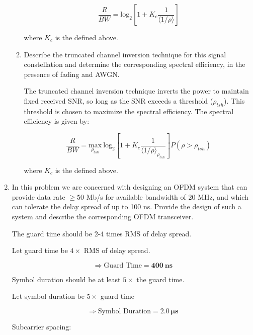 \documentclass[fleqn]{article}
\begin{document}
\begin{enumerate}
\begin{enumerate}
			\begin{equation*}
				\frac{R}{BW} = \text{log}_2\left[1 + K_c\frac{1}{\langle1/\rho\rangle}\right]
			\end{equation*}
			
			where $K_c$ is the defined above.
			
			\item Describe the truncated channel inversion technique for this signal constellation and determine the corresponding spectral efficiency, in the presence of fading and AWGN.
			
			The truncated channel inversion technique inverts the power to maintain fixed received SNR, so long as the SNR exceeds a threshold ($\rho_{tsh}$). This threshold is chosen to maximize the spectral efficiency. The spectral efficiency is given by:
			
			\begin{equation*}
				\frac{R}{BW} = \underset{\rho_{tsh}}{\text{max}}\ \text{log}_2\left[1 + K_c\frac{1}{\langle1/\rho\rangle_{\rho_{tsh}}}\right]P(\rho > \rho_{tsh})
			\end{equation*}
			
			where $K_c$ is the defined above.
			
		\end{enumerate}
		
		\item In this problem we are concerned with designing an OFDM system that can provide data rate $\geq 50$ Mb/s for available bandwidth of 20 MHz, and which can tolerate the delay spread of up to 100 ns. Provide the design of such a system and describe the corresponding OFDM transceiver.
		
		The guard time should be 2-4 times RMS of delay spread.
		
		Let guard time be $4\times$ RMS of delay spread.
		
		\begin{equation*}
			\Rightarrow \text{Guard Time} = \mathbf{400\ ns}
		\end{equation*}
		
		Symbol duration should be at least $5\times$ the guard time. 
		
		Let symbol duration be $5\times$ guard time
		
		\begin{equation*}
			\Rightarrow \text{Symbol Duration} = \mathbf{2.0\ \mu{s}}
		\end{equation*}
		
		Subcarrier spacing:
		

\end{enumerate}
\end{document}
